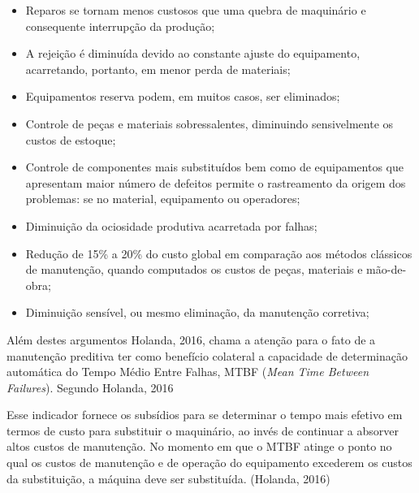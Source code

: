 \documentclass[
	12pt,				
	oneside,			
	a4paper,			
	english,			
	brazil				
	]{abntex2ppgsi}
\begin{document}
\begin{itemize}
	\item Reparos se tornam menos custosos que uma quebra de maquinário e consequente interrupção da produção;
	\item A rejeição é diminuída devido ao constante ajuste do equipamento, acarretando, portanto, em menor perda de materiais;
	\item Equipamentos reserva podem, em muitos casos, ser eliminados;
	\item Controle de peças e materiais sobressalentes, diminuindo sensivelmente os custos de estoque;
	\item Controle de componentes mais substituídos bem como de equipamentos que apresentam maior número de defeitos permite o rastreamento da origem dos problemas: se no material, equipamento ou operadores;
	\item Diminuição da ociosidade produtiva acarretada por falhas;
	\item Redução de 15\% a 20\% do custo global em comparação aos métodos clássicos de manutenção, quando computados os custos de peças, materiais e mão-de-obra;
	\item Diminuição sensível, ou mesmo eliminação, da manutenção corretiva;
\end{itemize}

Além destes argumentos Holanda, 2016, chama a atenção para o fato de a manutenção preditiva ter como benefício colateral a capacidade de determinação automática do Tempo Médio Entre Falhas, MTBF (\textit{Mean Time Between Failures}). Segundo Holanda, 2016

\begin{citacao}
Esse indicador fornece os subsídios para se determinar o tempo mais efetivo em termos de custo para substituir o maquinário, ao invés de continuar a absorver altos custos de manutenção. No momento em que o MTBF atinge o ponto no qual os custos de manutenção e de operação do equipamento excederem os custos da substituição, a máquina deve ser substituída. (Holanda, 2016)
\end{citacao}
\end{document}
